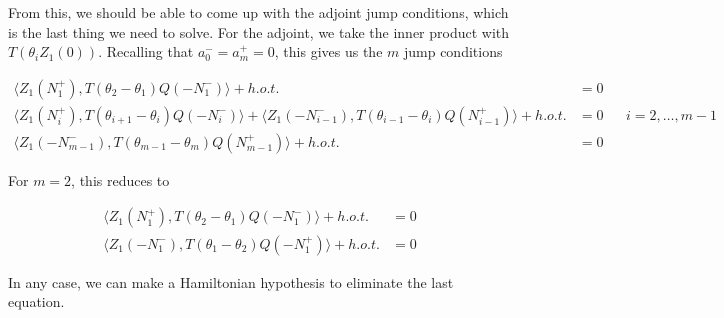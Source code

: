 \documentclass[12pt]{article}
\begin{document}
From this, we should be able to come up with the adjoint jump conditions, which is the last thing we need to solve. For the adjoint, we take the inner product with $T(\theta_i Z_1(0))$. Recalling that $a_0^- = a_m^+  = 0$, this gives us the $m$ jump conditions

\begin{align*}
\langle Z_1(N_1^+), T(\theta_{2}-\theta_1) Q(-N_1^-)\rangle
+ h.o.t. &= 0 \\
\langle Z_1(N_i^+), T(\theta_{i+1}-\theta_i) Q(-N_i^-)\rangle
+ \langle Z_1(-N_{i-1}^-), T(\theta_{i-1}-\theta_i) Q(N_{i-1}^+)\rangle
+ h.o.t. &= 0 && i = 2, \dots, m-1 \\
\langle Z_1(-N_{m-1}^-), T(\theta_{m-1}-\theta_m) Q(N_{m-1}^+)\rangle
+ h.o.t. &= 0
\end{align*}

For $m = 2$, this reduces to

\begin{align*}
\langle Z_1(N_1^+), T(\theta_{2}-\theta_1) Q(-N_1^-)\rangle
+ h.o.t. &= 0 \\
\langle Z_1(-N_1^-), T(\theta_{1}-\theta_2) Q(-N_1^+)\rangle
+ h.o.t. &= 0
\end{align*}

In any case, we can make a Hamiltonian hypothesis to eliminate the last equation. 
\end{document}
